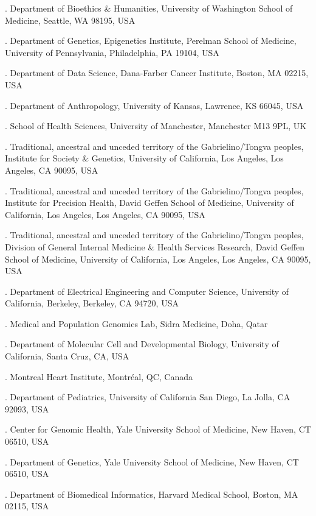 \documentclass[pdflatex,mathphys]{jnl}
\begin{document}
{. Department of Bioethics \& Humanities, University of Washington School of Medicine, Seattle, WA 98195, USA\par
{}. Department of Genetics, Epigenetics Institute, Perelman School of Medicine, University of Pennsylvania, Philadelphia, PA 19104, USA\par
{}. Department of Data Science, Dana-Farber Cancer Institute, Boston, MA 02215, USA\par
{}. Department of Anthropology, University of Kansas, Lawrence, KS 66045, USA\par
{}. School of Health Sciences, University of Manchester, Manchester M13 9PL, UK\par
{}. Traditional, ancestral and unceded territory of the Gabrielino/Tongva peoples, Institute for Society \& Genetics, University of California, Los Angeles, Los Angeles, CA 90095, USA\par
{}. Traditional, ancestral and unceded territory of the Gabrielino/Tongva peoples, Institute for Precision Health, David Geffen School of Medicine, University of California, Los Angeles, Los Angeles, CA 90095, USA\par
{}. Traditional, ancestral and unceded territory of the Gabrielino/Tongva peoples, Division of General Internal Medicine \& Health Services Research, David Geffen School of Medicine, University of California, Los Angeles, Los Angeles, CA 90095, USA\par
{}. Department of Electrical Engineering and Computer Science, University of California, Berkeley, Berkeley, CA 94720, USA\par
{}. Medical and Population Genomics Lab, Sidra Medicine, Doha, Qatar\par
{}. Department of Molecular Cell and Developmental Biology, University of California, Santa Cruz, CA, USA\par
{}. Montreal Heart Institute, Montr\'eal, QC, Canada\par
{}. Department of Pediatrics, University of California San Diego, La Jolla, CA 92093, USA\par
{}. Center for Genomic Health, Yale University School of Medicine, New Haven, CT 06510, USA\par
{}. Department of Genetics, Yale University School of Medicine, New Haven, CT 06510, USA\par
{}. Department of Biomedical Informatics, Harvard Medical School, Boston, MA 02115, USA\par
}
\end{document}
